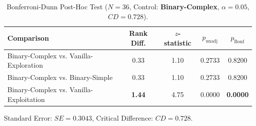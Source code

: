 \begin{table}[htbp]
  \centering
  \small
  \caption{Bonferroni-Dunn Post-Hoc Test ($N=36$, Control: \textbf{Binary-Complex}, $\alpha=0.05$, $CD=0.728$).}
  \label{tab:bonferroni_posthoc_inst29}
  \begin{tabular}{lcccc}
    \toprule
    \textbf{Comparison} & \textbf{Rank Diff.} & \textbf{$z$-statistic} & \textbf{$p_{\text{unadj}}$} & \textbf{$p_{\text{Bonf}}$} \\
    \midrule
    Binary-Complex vs. Vanilla-Exploration &   0.33 &  1.10 &  0.2733 &  0.8200 \\
    Binary-Complex vs. Binary-Simple       &   0.33 &  1.10 &  0.2733 &  0.8200 \\
    Binary-Complex vs. Vanilla-Exploitation & \textbf{1.44} &  4.75 &  0.0000 & \textbf{0.0000} \\
    \bottomrule
  \end{tabular}
  \vspace{1ex}

  \footnotesize Standard Error: $SE=0.3043$, Critical Difference: $CD=0.728$.
\end{table}
